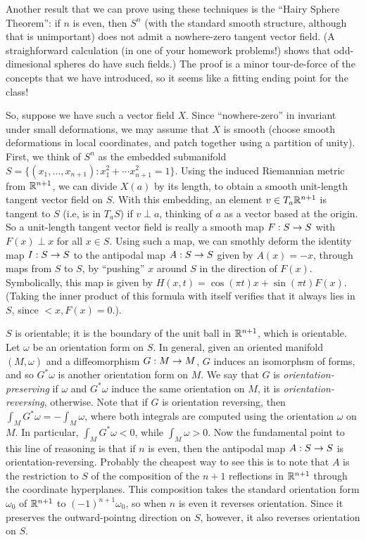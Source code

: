 \ssk

Another result that we can prove using these techniques is the ``Hairy Sphere Theorem'': if $n$ is even,
then $S^n$ (with the standard smooth structure, although that is unimportant) does not admit a 
nowhere-zero tangent vector field. (A straighforward calculation (in one of your homework problems!)
shows that odd-dimesional spheres do have such fields.) The proof is a minor tour-de-force of the
concepts that we have introduced, so it seems like a fitting ending point for the class!

So, suppose we have such a vector field $X$. Since ``nowhere-zero'' in invariant under small
deformations, we may assume that $X$ is smooth (choose smooth deformations in local coordinates, and
patch together using a partition of unity).
First, we think of $S^n$ as the embedded submanifold $S=\{(x_1,\ldots,x_{n+1}) : x_1^2+\cdots x_{n+1}^2=1\}$.
Using the induced Riemannian metric from ${\Bbb R}^{n+1}$, we can divide $X(a)$ by its length, to obtain 
a smooth unit-length tangent vector field on $S$.
With this embedding, an element $v\in T_a{\Bbb R}^{n+1}$ is tangent to $S$ (i.e, is in $T_aS$) if
$v\perp a$, thinking of $a$ as a vector based at the origin. So a unit-length tangent vector field is 
really a smooth map $F:S\rightarrow S$ with $F(x)\perp x$ for all $x\in S$. Using such a map,
we can smothly deform the identity map $I:S\rightarrow S$ to the antipodal map $A:S\rightarrow S$
given by $A(x)=-x$, through maps from $S$ to $S$, by ``pushing'' $x$ around $S$ in the direction
of $F(x)$. Symbolically, this map is given by
$H(x,t)=\cos(\pi t)x+\sin(\pi t)F(x)$. (Taking the inner product of this formula with itself verifies
that it always lies in $S$, since $<x,F(x)=0$.).

$S$ is orientable; it is the boundary of the unit ball in ${\Bbb R}^{n+1}$, which is
orientable. Let $\omega$ be an orientation form on $S$. In general, given 
an oriented manifold $(M,\omega)$ and a diffeomorphism $G:M\rightarrow M$,
$G$ induces an isomorphsm of forms, and so $G^*\omega$ is another orientation
form on $M$. We say that $G$ is {\it orientation-preserving} if $\omega$ and $G^*\omega$ induce
the same orientation on $M$, it is {\it orientation-reversing}, otherwise. Note that if
$G$ is orientation reversing, then $\int_MG^*\omega=-\int_M\omega$, where both integrals
are computed using the orientation $\omega$ on $M$. In particular, $\int_MG^*\omega<0$, while
$\int_M\omega>0$. Now the fundamental point to this line of reasoning is that if $n$ is even, 
then the antipodal map $A:S\rightarrow S$ is orientation-reversing. Probably the cheapest way to see this 
is to note that $A$ is the restriction to $S$ of the composition of the
$n+1$ reflections in ${\Bbb R}^{n+1}$ through the coordinate hyperplanes. This composition
takes the standard orientation form $\omega_0$ of ${\Bbb R}^{n+1}$ to $(-1)^{n+1}\omega_0$,
so when $n$ is even it reverses orientation. Since it preserves the outward-pointng direction
on $S$, however, it also reverses orientation on $S$.

